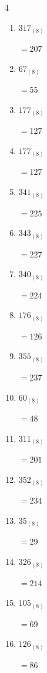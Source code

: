 \begin{multicols}{4}
\begin{enumerate}
        $=56$

  \item $317_{(8)}$

        $=207$

  \item $67_{(8)}$

        $=55$

  \item $177_{(8)}$

        $=127$

  \item $177_{(8)}$

        $=127$

  \item $341_{(8)}$

        $=225$

  \item $343_{(8)}$

        $=227$

  \item $340_{(8)}$

        $=224$

  \item $176_{(8)}$

        $=126$

  \item $355_{(8)}$

        $=237$

  \item $60_{(8)}$

        $=48$

  \item $311_{(8)}$

        $=201$

  \item $352_{(8)}$

        $=234$

  \item $35_{(8)}$

        $=29$

\columnbreak %

  \item $326_{(8)}$

        $=214$

  \item $105_{(8)}$

        $=69$

  \item $126_{(8)}$

        $=86$


\end{enumerate}
\end{multicols}
